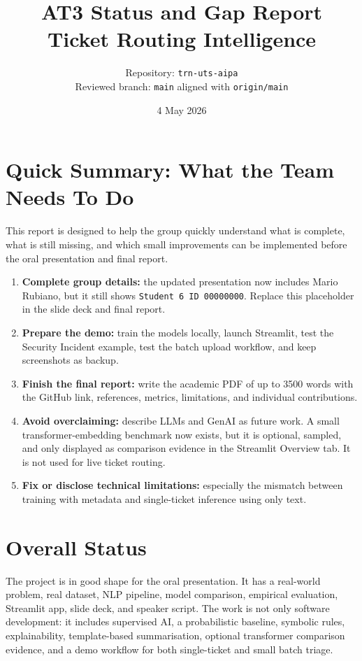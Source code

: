 \documentclass[11pt,a4paper]{article}
\title{\textbf{AT3 Status and Gap Report}\\
Ticket Routing Intelligence}
\author{Repository: \texttt{trn-uts-aipa} \\ Reviewed branch: \texttt{main} aligned with \texttt{origin/main}}
\date{4 May 2026}
\begin{document}
\maketitle

\section*{Quick Summary: What the Team Needs To Do}
This report is designed to help the group quickly understand what is complete, what is still missing, and which small improvements can be implemented before the oral presentation and final report.

\begin{enumerate}
  \item \textbf{Complete group details:} the updated presentation now includes Mario Rubiano, but it still shows \texttt{Student 6 ID 00000000}. Replace this placeholder in the slide deck and final report.
  \item \textbf{Prepare the demo:} train the models locally, launch Streamlit, test the Security Incident example, test the batch upload workflow, and keep screenshots as backup.
  \item \textbf{Finish the final report:} write the academic PDF of up to 3500 words with the GitHub link, references, metrics, limitations, and individual contributions.
  \item \textbf{Avoid overclaiming:} describe LLMs and GenAI as future work. A small transformer-embedding benchmark now exists, but it is optional, sampled, and only displayed as comparison evidence in the Streamlit Overview tab. It is not used for live ticket routing.
  \item \textbf{Fix or disclose technical limitations:} especially the mismatch between training with metadata and single-ticket inference using only text.
\end{enumerate}

\section{Overall Status}
The project is in good shape for the oral presentation. It has a real-world problem, real dataset, NLP pipeline, model comparison, empirical evaluation, Streamlit app, slide deck, and speaker script. The work is not only software development: it includes supervised AI, a probabilistic baseline, symbolic rules, explainability, template-based summarisation, optional transformer comparison evidence, and a demo workflow for both single-ticket and small batch triage.
\end{document}
